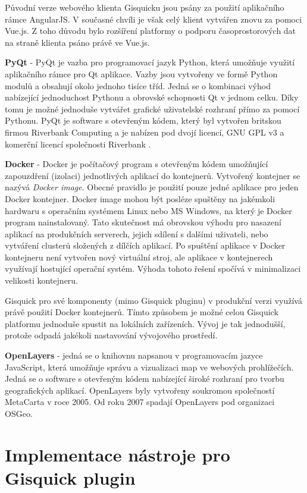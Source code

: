 Původní verze webového klienta Gisquicku jsou psány za použití
aplikačního rámce AngularJS. V současné chvíli je však celý klient
vytvářen znovu za pomoci Vue.js. Z toho důvodu bylo rozšíření platformy
o podporu časoprostorových dat na straně klienta psáno právě ve Vue.js.

\newpage
\bigskip
\noindent
\textbf{PyQt} - PyQt je vazba pro programovací jazyk Python, která umožňuje
využití aplikačního rámce pro Qt aplikace. Vazby jsou vytvořeny ve formě
Python modulů a obsahují okolo jednoho tisíce tříd. Jedná se o kombinaci
výhod nabízející jednoduchost Pythonu a obrovské schopnosti Qt v jednom
celku. Díky tomu je možné jednoduše vytvářet grafické uživatelské
rozhraní přímo za pomocí Pythonu. PyQt je software s otevřeným kódem,
který byl vytvořen britskou firmou Riverbank Computing a je nabízen pod
dvojí licencí, GNU GPL v3 a komerční licencí společnosti Riverbank
\cite{pyqt}.

\bigskip
\noindent
\textbf{Docker} - Docker je počítačový program s otevřeným
kódem umožňující zapouzdření (izolaci) jednotlivých aplikací do
kontejnerů. Vytvořený kontejner se nazývá \textit{Docker image}. Obecné
pravidlo je použití pouze jedné aplikace pro jeden Docker kontejner. Docker
image mohou být posléze spuštěny na jakémkoli hardwaru s operačním
systémem Linux nebo MS Windows, na který je Docker program nainstalovaný. Tato
skutečnost má obrovskou výhodu pro nasazení aplikací na produkčních
serverech, jejich sdílení s dalšími uživateli, nebo vytváření
clusterů složených z dílčích aplikací. Po spuštění aplikace v
Docker kontejneru není vytvořen nový virtuální stroj, ale aplikace
v kontejnerech využívají hostující operační systém. Výhoda tohoto
řešení spočívá v minimalizaci velikosti kontejneru.

Gisquick pro své komponenty (mimo Gisquick pluginu) v produkční
verzi využívá právě použití Docker kontejnerů. Tímto způsobem
je možné celou Gisquick platformu jednoduše spustit na lokálních
zařízeních. Vývoj je tak jednodušší, protože odpadá jakékoli
nastavování vývojového prostředí.

\bigskip
\noindent
\textbf{OpenLayers} - jedná se o knihovnu napsanou v programovacím
jazyce JavaScript, která umožňuje správu a vizualizaci map ve webových
prohlížečích. Jedná se o software s otevřeným kódem nabízející
široké rozhraní pro tvorbu geografických aplikací. OpenLayers byly
vytvořeny soukromou společností MetaCarta v roce 2005. Od roku 2007
spadají OpenLayers pod organizaci OSGeo.

\newpage
\section{Implementace nástroje pro Gisquick plugin}
\label{ssec:plugin-implementace}

